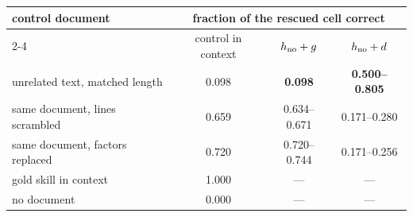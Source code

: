 \begin{tabular}{lccc}
\toprule
\rowcolor{TableHeader}
control document & \multicolumn{3}{c}{fraction of the rescued cell correct}\\
\cmidrule(lr){2-4}
 & control in context & $h_{\text{no}}+g$ & $h_{\text{no}}+d$ \\
\midrule
unrelated text, matched length      & 0.098 & \textbf{0.098} & \textbf{0.500--0.805} \\
same document, lines scrambled      & 0.659 & 0.634--0.671 & 0.171--0.280 \\
same document, factors replaced     & 0.720 & 0.720--0.744 & 0.171--0.256 \\
\midrule
gold skill in context & 1.000 & --- & --- \\
no document           & 0.000 & --- & --- \\
\bottomrule
\end{tabular}

